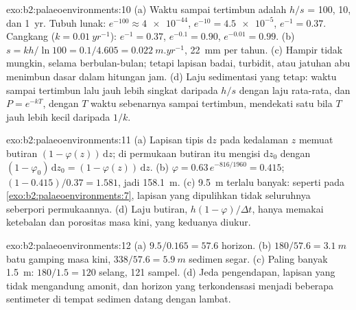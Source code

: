 \begin{solution}{exo:b2:palaeoenvironments:10}
(a) Waktu sampai tertimbun adalah $h/s$ = 100, 10, dan \qty{1}{yr}. Tubuh lunak: $e^{-100} \approx
\num{4e-44}$, $e^{-10} = \num{4.5e-5}$, $e^{-1} = 0.37$. Cangkang ($k = \qty{0.01}{yr^{-1}}$):
$e^{-1} = 0.37$, $e^{-0.1} = 0.90$, $e^{-0.01} = 0.99$. (b) $s = kh/\ln 100 = 0.1/4.605 =
\qty{0.022}{m.yr^{-1}}$, \qty{22}{mm} per tahun. (c) Hampir tidak mungkin, selama berbulan-bulan; tetapi lapisan badai,
turbidit, atau jatuhan abu menimbun dasar dalam hitungan jam. (d) Laju sedimentasi yang tetap: waktu
sampai tertimbun lalu jauh lebih singkat daripada $h/s$ dengan laju rata-rata, dan $P = e^{-kT}$, dengan $T$
waktu sebenarnya sampai tertimbun, mendekati satu bila $T$ jauh lebih kecil daripada $1/k$.
\end{solution}

\begin{solution}{exo:b2:palaeoenvironments:11}
(a) Lapisan tipis $\mathrm dz$ pada kedalaman $z$ memuat butiran $(1 - \varphi(z))\,\mathrm dz$;
di permukaan butiran itu mengisi $\mathrm dz_0$ dengan $(1 - \varphi_0)\,\mathrm dz_0 = (1 -
\varphi(z))\,\mathrm dz$. (b) $\varphi = 0.63\,e^{-816/1960} = 0.415$; $(1 - 0.415)/0.37 =
1.581$, jadi \qty{158.1}{m}. (c) \qty{9.5}{m} terlalu banyak: seperti pada \cref{exo:b2:palaeoenvironments:7},
lapisan yang dipulihkan tidak seluruhnya seberpori permukaannya. (d) Laju butiran,
$h(1-\varphi)/\Delta t$, hanya memakai ketebalan dan porositas masa kini, yang keduanya diukur.
\end{solution}

\begin{solution}{exo:b2:palaeoenvironments:12}
(a) $9.5/0.165 = 57.6$ horizon. (b) $180/57.6 = \qty{3.1}{m}$ batu gamping masa kini, $338/57.6 =
\qty{5.9}{m}$ sedimen segar. (c) Paling banyak \qty{1.5}{m}: $180/1.5 = 120$ selang, 121
sampel. (d) Jeda pengendapan, lapisan yang tidak mengandung amonit, dan horizon yang terkondensasi menjadi
beberapa sentimeter di tempat sedimen datang dengan lambat.
\end{solution}

